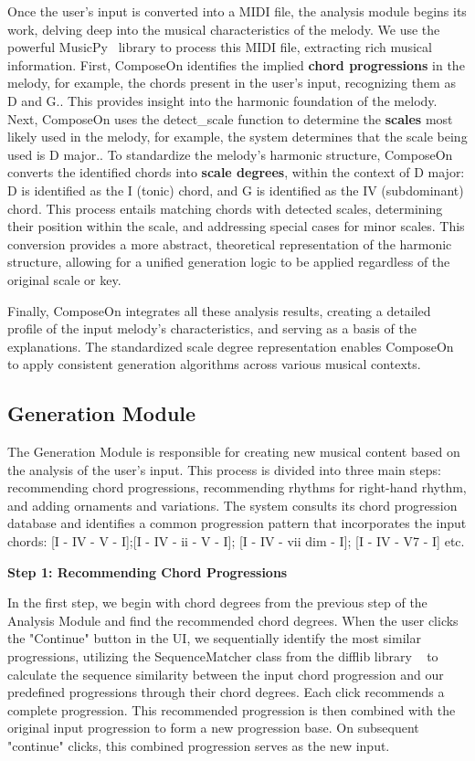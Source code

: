 Once the user's input is converted into a MIDI file, the analysis module begins its work, delving deep into the musical characteristics of the melody. We use the powerful MusicPy~\cite{r11} library to process this MIDI file, extracting rich musical information. First, ComposeOn identifies the implied \textbf{chord progressions} in the melody, for example, the chords present in the user's input, recognizing them as D and G.. This provides insight into the harmonic foundation of the melody. Next, ComposeOn uses the detect\_scale function to determine the \textbf{scales} most likely used in the melody, for example, the system determines that the scale being used is D major.. To standardize the melody's harmonic structure, ComposeOn converts the identified chords into \textbf{scale degrees}, within the context of D major: D is identified as the I (tonic) chord, and G is identified as the IV (subdominant) chord. This process entails matching chords with detected scales, determining their position within the scale, and addressing special cases for minor scales. This conversion provides a more abstract, theoretical representation of the harmonic structure, allowing for a unified generation logic to be applied regardless of the original scale or key.

Finally, ComposeOn integrates all these analysis results, creating a detailed profile of the input melody's characteristics, and serving as a basis of the explanations. The standardized scale degree representation enables ComposeOn to apply consistent generation algorithms across various musical contexts.

\subsection{Generation Module}

The Generation Module is responsible for creating new musical content based on the analysis of the user's input. This process is divided into three main steps: recommending chord progressions, recommending rhythms for right-hand rhythm, and adding ornaments and variations. The system consults its chord progression database and identifies a common progression pattern that incorporates the input chords: [I - IV - V - I];[I - IV - ii - V - I];  [I - IV - vii dim - I];  [I - IV - V7 - I] etc.

\textbf{Step 1: Recommending Chord Progressions}

In the first step, we begin with chord degrees from the previous step of the Analysis Module and find the recommended chord degrees. When the user clicks the "Continue" button in the UI, we sequentially identify the most similar progressions, utilizing the SequenceMatcher class from the difflib library ~\cite{pythondifflib} to calculate the sequence similarity between the input chord progression and our predefined progressions through their chord degrees.  Each click recommends a complete progression. This recommended progression is then combined with the original input progression to form a new progression base. On subsequent "continue" clicks, this combined progression serves as the new input. 

